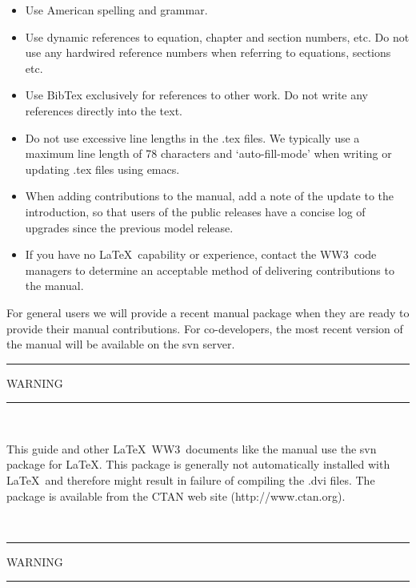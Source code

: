 \documentclass[12pt]{article}
\newcommand{\ws}{WW3}
\newcommand{\file}{\sf}
\newcommand{\pb}{\strut \vfill \pagebreak}
\newcommand{\bpage}{\vfill \pagebreak \strut

\vspace{2.5in} \centerline{This page is intentionally left blank.}}
\begin{document}
\begin{itemize}
\item Use American spelling and grammar.
\item Use dynamic references to equation, chapter and section numbers, etc. Do
      not use any hardwired reference numbers when referring to equations,
      sections etc.
\item Use BibTex exclusively for references to other work. Do not write any
      references directly into the text.
\item Do not use excessive line lengths in the {\file .tex} files. We
      typically use a maximum line length of 78 characters and
      `auto-fill-mode' when writing or updating {\file .tex} files using
      emacs. 
\item When adding contributions to the manual, add a note of the
      update to the introduction, so that users of the public releases
      have a concise log of upgrades since the previous model release.
\item If you have no \LaTeX\ capability or experience, contact the \ws\ code
      managers to determine an acceptable method of delivering contributions
      to the manual.
\end{itemize}

\noindent
For general users we will provide a recent manual package when they are ready
to provide their manual contributions. For co-developers, the most recent
version of the manual will be available on the svn server.

\vspace{\baselineskip}
\begin{center}
\rule[1mm]{55mm}{1.0mm} WARNING \rule[1mm]{55mm}{1.0mm} \\ 
\vspace{\baselineskip}
\parbox{120mm}{This guide and other \LaTeX\ \ws\ documents like the manual use
the svn package for \LaTeX. This package is generally not automatically
installed with \LaTeX\ and therefore might result in failure of compiling the
{\file .dvi} files. The package is available from the CTAN web site
(http://www.ctan.org).} \\ \vspace{\baselineskip} \rule[1mm]{55mm}{1.0mm}
WARNING \rule[1mm]{55mm}{1.0mm}
\end{center}


\pb
\end{document}
